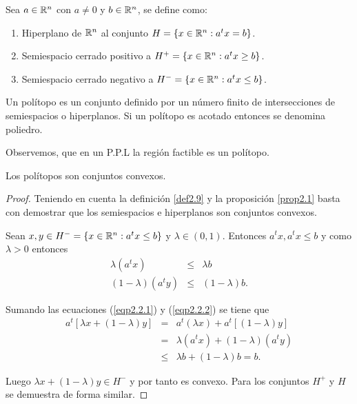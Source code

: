 \begin{definicion}
  Sea $a\in \mathbb R^n$ con $a\neq0$ y $b\in \mathbb R^n$, se define como:
  
  \begin{enumerate}
    \item Hiperplano de $\mathbb R^n$ al conjunto $H=\{x\in\mathbb R^n:a^tx=b\}$.
    \item Semiespacio cerrado positivo a  $H^+=\{x\in\mathbb R^n:a^tx\ge b\}$.
    \item Semiespacio cerrado negativo a $H^-=\{x\in\mathbb R^n:a^tx\le b\}$.
    
  \end{enumerate}
\end{definicion}

\begin{definicion}
  \label{def2.9}
  Un polítopo es un conjunto definido por un número finito de intersecciones de semiespacios o hiperplanos.
  Si un polítopo es acotado entonces se denomina poliedro.
\end{definicion}

Observemos, que en un P.P.L la región factible es un polítopo.

\begin{proposicion}
  Los polítopos son conjuntos convexos.
\end{proposicion}


\begin{proof}
  Teniendo en cuenta la definición \ref{def2.9} y la proposición \ref{prop2.1} basta con demostrar que los semiespacios e hiperplanos son conjuntos convexos.
  
  Sean $x,y\in H^- = \{x\in\mathbb R^n:a^tx\le b\}$ y $\lambda\in(0,1)$. Entonces $a^tx,a^tx\le b$ y como $\lambda>0$ entonces
  \begin{eqnarray}
    \lambda(a^tx) & \le &\lambda b \label{eqp2.2.1}\\
    (1-\lambda)(a^ty) & \le & (1-\lambda)b. \label{eqp2.2.2}
  \end{eqnarray}
  
  Sumando las ecuaciones (\ref{eqp2.2.1}) y (\ref{eqp2.2.2}) se tiene que
  \begin{eqnarray*}
    a^t[\lambda x+(1-\lambda)y]&=& a^t(\lambda x)+a^t[(1-\lambda)y]\\
                               &= &\lambda (a^tx)+(1-\lambda)(a^ty)\\
                               &\le & \lambda b+(1-\lambda)b = b.
  \end{eqnarray*}
  
  Luego $\lambda x+(1-\lambda)y \in H^-$ y por tanto es convexo. Para los conjuntos $H^+$ y $H$ se demuestra de forma similar.
\end{proof}



